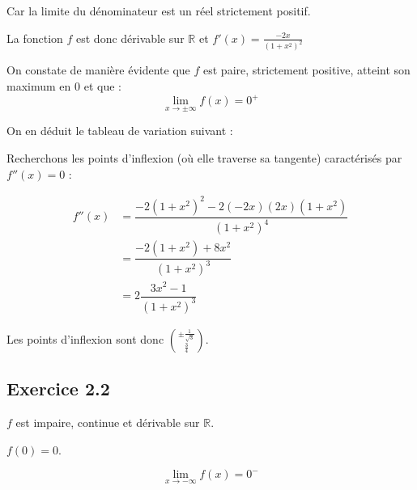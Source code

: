 \documentclass{report}
\begin{document}
Car la limite du dénominateur est un réel strictement positif.

La fonction $f$ est donc dérivable sur $\mathbb{R}$ et $f'(x) = \frac{-2x}{(1+x^2)^2}$

On constate de manière évidente que $f$ est paire, strictement positive, atteint son maximum en $0$ et que :
\begin{displaymath}
	\lim_{x \rightarrow \pm \infty} f(x) = 0^{+}
\end{displaymath}


On en déduit le tableau de variation suivant :


Recherchons les points d'inflexion (où elle traverse sa tangente) caractérisés par $f''(x)=0$ :

\begin{equation*}
	\begin{split}
		f''(x) &= \dfrac{-2(1+x^2)^2-2(-2x)(2x)(1+x^2)}{(1+x^2)^4} \\
		       &= \dfrac{-2(1+x^2)+8x^2}{(1+x^2)^3} \\
		       &= 2\dfrac{3x^2-1}{(1+x^2)^3} 
	\end{split}
\end{equation*}

Les points d'inflexion sont donc $\binom{\pm\frac{1}{\sqrt{3}}}{\frac{3}{4}}$.



\subsection*{Exercice 2.2}

$f$ est impaire, continue et dérivable sur $\mathbb{R}$.

$f(0) = 0$.

\begin{displaymath}
\lim_{x \rightarrow -\infty} f(x) = 0^{-}
\end{displaymath}
\end{document}
